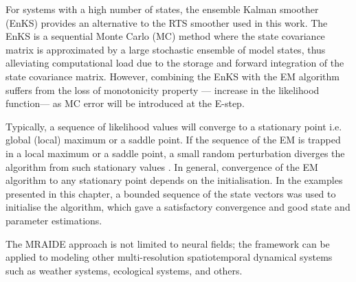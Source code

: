 \documentclass[11pt,draftcls,onecolumn,peerreview]{IEEEtran}
\newcommand{\mike}[1]{\textcolor{red}{#1}}
\newcommand{\parham}[1]{\textcolor{blue}{#1}}
\newcommand{\ken}[1]{\textsf{\emph{\textbf{\textcolor{magenta}{#1}}}}}
\begin{document}
For systems with a high number of states, the ensemble Kalman smoother (EnKS) \cite{Evensen2003,Evensen2009a,Evensen2009} provides an alternative to the RTS smoother used in this work. The EnKS is a sequential Monte Carlo (MC) method where the state covariance matrix is approximated by a large stochastic ensemble of model states, thus alleviating computational load due to the storage and forward integration of the state covariance matrix. However, combining the EnKS with the EM algorithm suffers from the loss of monotonicity property --- increase in the likelihood function--- as MC error will be introduced at the E-step.

Typically, a sequence of likelihood values will converge to a stationary point i.e. global (local) maximum or a saddle point. If the sequence of the EM is trapped in a local maximum or a saddle point, a small random perturbation diverges the algorithm from such stationary values \cite{McLachlan1997}. In general, convergence of the EM algorithm to any stationary point depends on the initialisation. In the examples presented in this chapter, a bounded sequence of the state vectors was used to initialise the algorithm, which gave a satisfactory convergence and good state and parameter estimations.


The MRAIDE approach is not limited to neural fields; the framework can be applied to modeling other multi-resolution spatiotemporal dynamical systems such as weather systems, ecological systems, and others\cite{Wikle2002,Xu2005}. 

\end{document}
